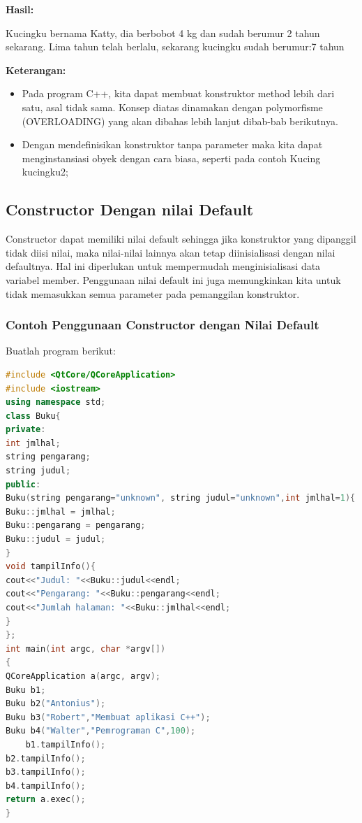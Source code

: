 \textbf{Hasil:}

\begin{lcverbatim}
Kucingku bernama Katty, dia berbobot 4 kg dan 
sudah berumur 2 tahun sekarang.
Lima tahun telah berlalu, sekarang kucingku 
sudah berumur:7 tahun
\end{lcverbatim}

\textbf{Keterangan:}

\begin{itemize}

\item
  Pada program C++, kita dapat membuat konstruktor method lebih dari
  satu, asal tidak sama. Konsep diatas dinamakan dengan polymorfisme
  (OVERLOADING) yang akan dibahas lebih lanjut dibab-bab berikutnya.
\item
  Dengan mendefinisikan konstruktor tanpa parameter maka kita dapat
  menginstansiasi obyek dengan cara biasa, seperti pada contoh Kucing
  kucingku2;
\end{itemize}

\subsection{Constructor Dengan nilai
Default}\label{constructor-dengan-nilai-default}

Constructor dapat memiliki nilai default sehingga jika konstruktor yang
dipanggil tidak diisi nilai, maka nilai-nilai lainnya akan tetap
diinisialisasi dengan nilai defaultnya. Hal ini diperlukan untuk
mempermudah menginisialisasi data variabel member. Penggunaan nilai
default ini juga memungkinkan kita untuk tidak memasukkan semua
parameter pada pemanggilan konstruktor.

\subsubsection*{Contoh  Penggunaan Constructor dengan Nilai Default}

Buatlah program berikut:

\begin{lstlisting}[language=c++, caption=Penggunaan Constructor dengan Nilai Default, label=contoh6-10]
#include <QtCore/QCoreApplication>
#include <iostream>
using namespace std;
class Buku{
private:
int jmlhal;
string pengarang;
string judul;
public:
Buku(string pengarang="unknown", string judul="unknown",int jmlhal=1){
Buku::jmlhal = jmlhal;
Buku::pengarang = pengarang;
Buku::judul = judul;
}
void tampilInfo(){
cout<<"Judul: "<<Buku::judul<<endl;
cout<<"Pengarang: "<<Buku::pengarang<<endl;
cout<<"Jumlah halaman: "<<Buku::jmlhal<<endl;
}
};
int main(int argc, char *argv[])
{
QCoreApplication a(argc, argv);
Buku b1;
Buku b2("Antonius");
Buku b3("Robert","Membuat aplikasi C++");
Buku b4("Walter","Pemrograman C",100);
    b1.tampilInfo();
b2.tampilInfo();
b3.tampilInfo();
b4.tampilInfo();
return a.exec();
}
\end{lstlisting}

